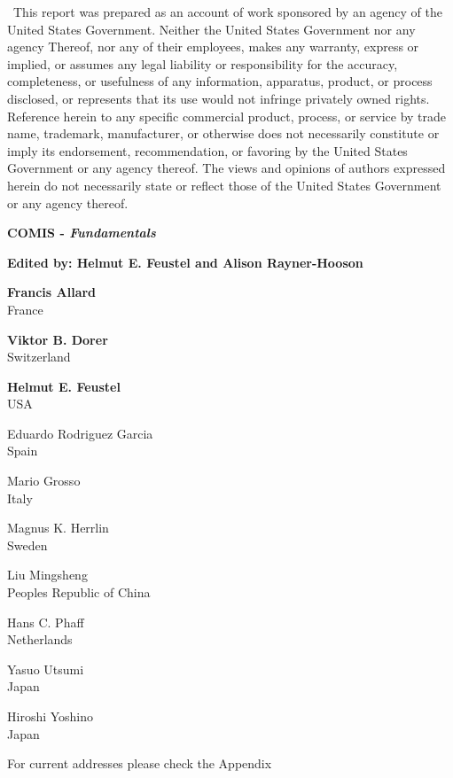 \documentclass[12pt]{report}
\begin{document}
\noindent~This report was prepared as an account of work sponsored by an
agency of the United States Government. Neither the United States
Government nor any agency Thereof, nor any of their employees,
makes any warranty, express or implied, or assumes any legal
liability or responsibility for the accuracy, completeness, or
usefulness of any information, apparatus, product, or process
disclosed, or represents that its use would not infringe privately
owned rights. Reference herein to any specific commercial product,
process, or service by trade name, trademark, manufacturer, or
otherwise does not necessarily constitute or imply its endorsement,
recommendation, or favoring by the United States Government or any
agency thereof. The views and opinions of authors expressed herein
do not necessarily state or reflect those of the United States
Government or any agency thereof.
\newpage
\begin{flushleft}
{\Huge
\textbf{COMIS - \textit{Fundamentals}}
}

\vspace{0.25in}
\textbf{Edited by: Helmut E. Feustel and Alison Rayner-Hooson}
\vspace{0.25in}

{\Large
\textbf{Francis Allard}\\
France

\textbf{Viktor B. Dorer}\\
Switzerland

\textbf{Helmut E. Feustel}\\
USA

Eduardo Rodriguez Garcia\\
Spain

Mario Grosso\\
Italy

Magnus K. Herrlin\\
Sweden

Liu Mingsheng\\
Peoples Republic of China

Hans C. Phaff\\
Netherlands

Yasuo Utsumi\\
Japan

Hiroshi Yoshino\\
Japan
}

\vspace{0.25in}
 For current addresses please check the Appendix
 \end{flushleft}
\end{document}
